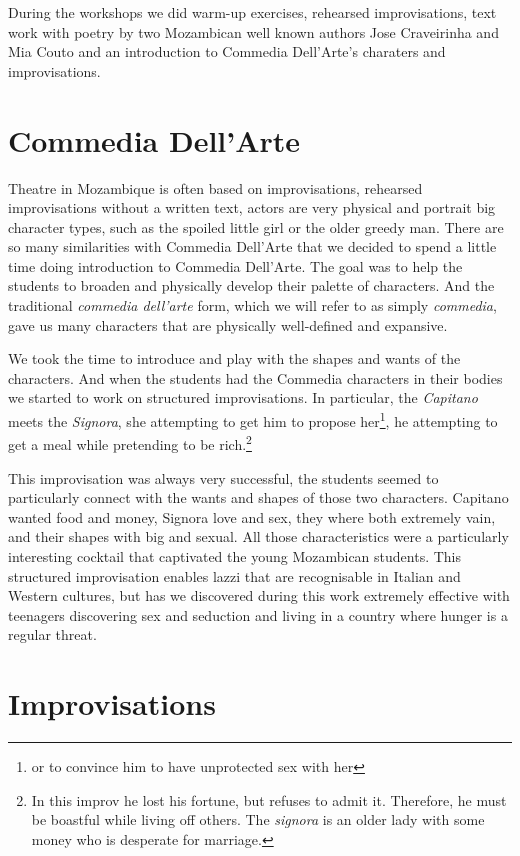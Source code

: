 \documentclass[article,twocolumn,twoside]{memoir}
\begin{document}
During the workshops we did warm-up exercises, rehearsed improvisations, text
work with poetry by two Mozambican well known authors Jose Craveirinha and
Mia Couto and an introduction to Commedia Dell'Arte's charaters and
improvisations.

\section{Commedia Dell'Arte}

Theatre in Mozambique is often based on improvisations, rehearsed improvisations
without a written text, actors are very physical and portrait big character
types, such as the spoiled little girl or the older greedy man. There are so
many similarities with Commedia Dell'Arte that we decided to spend a little
time doing introduction to Commedia Dell'Arte. The goal was to help the
students to broaden and physically develop their palette of characters. And the
traditional \textit{commedia dell'arte} form, which we will refer to as simply
\textit{commedia}, gave us many characters that are physically well-defined and
expansive.

We took the time to introduce and play with the shapes and wants of the
characters. And when the students had the Commedia characters in their bodies
we started to work on structured improvisations. In particular, the
\textit{Capitano} meets the \textit{Signora}, she attempting to get him to
propose her\footnote{or to convince him to have unprotected sex with her}, he
attempting to get a meal while pretending to be rich.\footnote{In this improv
he lost his fortune, but refuses to admit it. Therefore, he must be boastful
while living off others. The \textit{signora} is an older lady with some money
who is desperate for marriage.}

This improvisation was always very successful, the students seemed to
particularly connect with the wants and shapes of those two characters.
Capitano wanted food and money, Signora love and sex, they where both extremely
vain, and their shapes with big and sexual. All those characteristics were a
particularly interesting cocktail that captivated the young Mozambican
students. This structured improvisation enables lazzi that are recognisable in
Italian and Western cultures, but has we discovered during this work extremely
effective with teenagers discovering sex and seduction and living in a country
where hunger is a regular threat.

\section{Improvisations}
\end{document}
